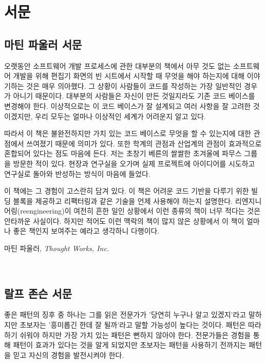 \documentclass[a4paper,10pt,twoside]{book}
\begin{document}
	\frontmatter
	\sloppy
\fi
\chapter{서문}

\section*{마틴 파울러 서문}

오랫동안 소프트웨어 개발 프로세스에 관한 대부분의 책에서 아무 것도 없는 소프트웨어 개발을 위해 편집기 화면의 빈 시트에서 시작할 때 무엇을 해야 하는지에 대해 이야기하는 것은 매우 의아했다. 그 상황이 사람들이 코드를 작성하는 가장 일반적인 경우가 아니기 때문이다. 대부분의 사람들은 자신이 만든 것일지라도 기존 코드 베이스를 변경해야 한다. 이상적으로는 이 코드 베이스가 잘 설계되고 여러 사항을 잘 고려한 것이겠지만, 우리 모두는 얼마나 이상적인 세계가 어려운지 알고 있다.

따라서 이 책은 불완전하지만 가치 있는 코드 베이스로 무엇을 할 수 있는지에 대한 관점에서 쓰여졌기 때문에 의미가 있다. 또한 학계의 관점과 산업계의 관점이 효과적으로 혼합되어 있다는 점도 마음에 든다. 저는 초창기 베른의 쌀쌀한 초겨울에 파무스 그룹을 방문한 적이 있다. 현장과 연구실을 오가며 실제 프로젝트에 아이디어를 시도하고 연구실로 돌아와 반성하는 방식이 마음에 들었다.

이 책에는 그 경험이 고스란히 담겨 있다. 이 책은 어려운 코드 기반을 다루기 위한 빌딩 블록을 제공하고 리팩터링과 같은 기술을 언제 사용해야 하는지 설명한다. 리엔지니어링(reengineering)이 여전히 흔한 일인 상황에서 이런 종류의 책이 너무 적다는 것은 안타까운 사실이다. 하지만 적어도 이런 맥락의 책이 많지 않은 상황에서 이 책이 얼마나 좋은 책인지 보여주는 예라고 생각하니 다행이다.

\hfill 마틴 파울러, \emph{Thought Works, Inc.}

\newpage
~
\vfill
\section*{랄프 존슨 서문}

\noindent
좋은 패턴의 징후 중 하나는 그를 읽은 전문가가 '당연히 누구나 알고 있겠지'라고 말하지만 초보자는 '흥미롭긴 한데 잘 될까'라고 말할 가능성이 높다는 것이다.  패턴은 따라하기 쉬워야 하지만 가장 가치 있는 패턴은 뻔하지 않아야 한다.  전문가들은 경험을 통해 패턴이 효과가 있다는 것을 알게 되었지만 초보자는 패턴을 사용하기 전까지는 패턴을 믿고 자신의 경험을 발전시켜야 한다.
\end{document}
